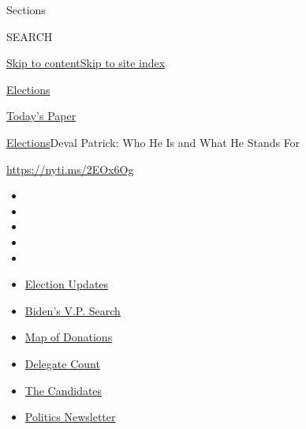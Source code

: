Sections

SEARCH

\protect\hyperlink{site-content}{Skip to
content}\protect\hyperlink{site-index}{Skip to site index}

\href{https://www.nytimes.com/news-event/2020-election}{Elections}

\href{https://myaccount.nytimes.com/auth/login?response_type=cookie\&client_id=vi}{}

\href{https://www.nytimes.com/section/todayspaper}{Today's Paper}

\href{/news-event/2020-election}{Elections}\textbar{}Deval Patrick: Who
He Is and What He Stands For

\url{https://nyti.ms/2EOx6Og}

\begin{itemize}
\item
\item
\item
\item
\item
\end{itemize}

\begin{itemize}
\item
  \href{https://www.nytimes.com/2020/07/31/us/elections/biden-vs-trump.html?action=click\&pgtype=Article\&state=default\&region=TOP_BANNER\&context=storylines_menu}{Election
  Updates}
\item
  \href{https://www.nytimes.com/article/biden-vice-president-2020.html?action=click\&pgtype=Article\&state=default\&region=TOP_BANNER\&context=storylines_menu}{Biden's
  V.P. Search}
\item
  \href{https://www.nytimes.com/interactive/2020/07/24/us/politics/trump-biden-campaign-donors.html?action=click\&pgtype=Article\&state=default\&region=TOP_BANNER\&context=storylines_menu}{Map
  of Donations}
\item
  \href{https://www.nytimes.com/interactive/2020/us/elections/delegate-count-primary-results.html?action=click\&pgtype=Article\&state=default\&region=TOP_BANNER\&context=storylines_menu}{Delegate
  Count}
\item
  \href{https://www.nytimes.com/interactive/2019/us/politics/2020-presidential-candidates.html?action=click\&pgtype=Article\&state=default\&region=TOP_BANNER\&context=storylines_menu}{The
  Candidates}
\item
  \href{https://www.nytimes.com/newsletters/politics?action=click\&pgtype=Article\&state=default\&region=TOP_BANNER\&context=storylines_menu}{Politics
  Newsletter}
\end{itemize}

